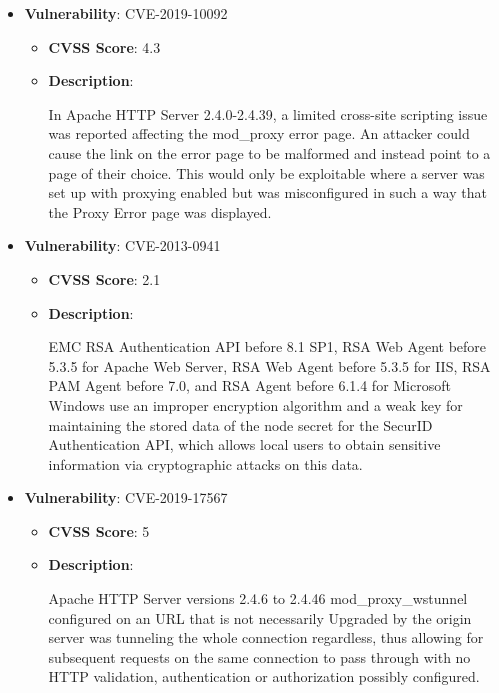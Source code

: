 \documentclass{article}
\begin{document}
\begin{itemize}
        \item \textbf{Vulnerability}: CVE-2019-10092
        \begin{itemize}
            \item \textbf{CVSS Score}:  4.3 
            \item \textbf{Description}:
            \parbox[t]{0.9\linewidth}{
                \ttfamily In Apache HTTP Server 2.4.0-2.4.39, a limited cross-site scripting issue was reported affecting the mod\_proxy error page. An attacker could cause the link on the error page to be malformed and instead point to a page of their choice. This would only be exploitable where a server was set up with proxying enabled but was misconfigured in such a way that the Proxy Error page was displayed.
            }
        \end{itemize}
    
        \item \textbf{Vulnerability}: CVE-2013-0941
        \begin{itemize}
            \item \textbf{CVSS Score}:  2.1 
            \item \textbf{Description}:
            \parbox[t]{0.9\linewidth}{
                \ttfamily EMC RSA Authentication API before 8.1 SP1, RSA Web Agent before 5.3.5 for Apache Web Server, RSA Web Agent before 5.3.5 for IIS, RSA PAM Agent before 7.0, and RSA Agent before 6.1.4 for Microsoft Windows use an improper encryption algorithm and a weak key for maintaining the stored data of the node secret for the SecurID Authentication API, which allows local users to obtain sensitive information via cryptographic attacks on this data.
            }
        \end{itemize}
    
        \item \textbf{Vulnerability}: CVE-2019-17567
        \begin{itemize}
            \item \textbf{CVSS Score}:  5 
            \item \textbf{Description}:
            \parbox[t]{0.9\linewidth}{
                \ttfamily Apache HTTP Server versions 2.4.6 to 2.4.46 mod\_proxy\_wstunnel configured on an URL that is not necessarily Upgraded by the origin server was tunneling the whole connection regardless, thus allowing for subsequent requests on the same connection to pass through with no HTTP validation, authentication or authorization possibly configured.
            }
        \end{itemize}
    

\end{itemize}
\end{document}
